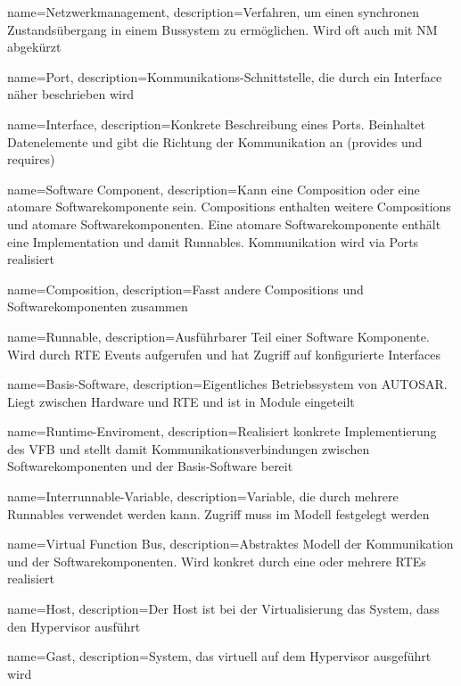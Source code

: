  {
   name=Netzwerkmanagement,
   description={Verfahren, um einen synchronen Zustandsübergang in einem Bussystem zu ermöglichen. Wird oft auch mit NM abgekürzt}
}


 {
   name=Port,
   description={Kommunikations-Schnittstelle, die durch ein Interface näher beschrieben wird}
}

 {
   name=Interface,
   description={Konkrete Beschreibung eines Ports. Beinhaltet Datenelemente und gibt die Richtung der Kommunikation an (provides und requires)}
}

 {
   name=Software Component,
   description={Kann eine Composition oder eine atomare Softwarekomponente sein. Compositions enthalten weitere Compositions und atomare Softwarekomponenten. Eine atomare Softwarekomponente enthält eine Implementation und damit Runnables. Kommunikation wird via Ports realisiert}
}

 {
   name=Composition,
   description={Fasst andere Compositions und Softwarekomponenten zusammen}
}

 {
   name=Runnable,
   description={Ausführbarer Teil einer Software Komponente. Wird durch RTE Events aufgerufen und hat Zugriff auf konfigurierte Interfaces}
}

 {
   name=Basis-Software,
   description={Eigentliches Betriebssystem von AUTOSAR. Liegt zwischen Hardware und RTE und ist in Module eingeteilt}
}

 {
   name=Runtime-Enviroment,
   description={Realisiert konkrete Implementierung des VFB und stellt damit Kommunikationsverbindungen zwischen Softwarekomponenten und der Basis-Software bereit}
}

 {
   name=Interrunnable-Variable,
   description={Variable, die durch mehrere Runnables verwendet werden kann. Zugriff muss im Modell festgelegt werden}
}

 {
   name=Virtual Function Bus,
   description={Abstraktes Modell der Kommunikation und der Softwarekomponenten. Wird konkret durch eine oder mehrere RTEs realisiert}
}

 {
   name=Host,
   description={Der Host ist bei der Virtualisierung das System, dass den Hypervisor ausführt}
}

 {
   name=Gast,
   description={System, das virtuell auf dem Hypervisor ausgeführt wird}
}
